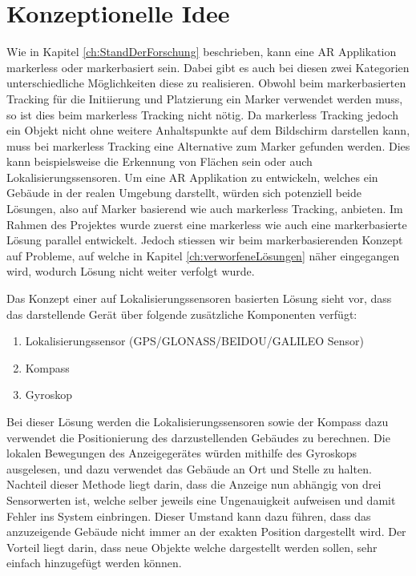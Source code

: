 \documentclass[a4paper]{scrreprt}
\begin{document}
\section{Konzeptionelle Idee}
\label{ch:KonzeptionelleIdee}
Wie in Kapitel \ref{ch:StandDerForschung} beschrieben, kann eine AR Applikation markerless oder markerbasiert sein. Dabei gibt es auch bei diesen zwei Kategorien unterschiedliche Möglichkeiten diese zu realisieren. Obwohl beim markerbasierten Tracking für die Initiierung und Platzierung ein Marker verwendet werden muss, so ist dies beim markerless Tracking nicht nötig. Da markerless Tracking jedoch ein Objekt nicht ohne weitere Anhaltspunkte auf dem Bildschirm darstellen kann, muss bei markerless Tracking eine Alternative zum Marker gefunden werden. Dies kann beispielsweise die Erkennung von Flächen sein \parencite{GoogleARCore2018} oder auch Lokalisierungssensoren.
Um eine AR Applikation zu entwickeln, welches ein Gebäude in der realen Umgebung darstellt, würden sich potenziell beide Lösungen, also auf Marker basierend wie auch markerless Tracking, anbieten.
Im Rahmen des Projektes wurde zuerst eine markerless wie auch eine markerbasierte Lösung parallel entwickelt. Jedoch stiessen wir beim markerbasierenden Konzept auf Probleme, auf welche in Kapitel \ref{ch:verworfeneLösungen} näher eingegangen wird, wodurch Lösung nicht weiter verfolgt wurde.


\bigbreak
Das Konzept einer auf Lokalisierungssensoren basierten Lösung sieht vor, dass das darstellende Gerät über folgende zusätzliche Komponenten verfügt:
\begin{enumerate}
	\item Lokalisierungssensor (GPS/GLONASS/BEIDOU/GALILEO Sensor)
	\item Kompass
	\item Gyroskop
\end{enumerate}

Bei dieser Lösung werden die Lokalisierungssensoren sowie der Kompass dazu verwendet die Positionierung des darzustellenden Gebäudes zu berechnen. Die lokalen Bewegungen des Anzeigegerätes würden mithilfe des Gyroskops ausgelesen, und dazu verwendet das Gebäude an Ort und Stelle zu halten.
Nachteil dieser Methode liegt darin, dass die Anzeige nun abhängig von drei Sensorwerten ist, welche selber jeweils eine Ungenauigkeit aufweisen und damit Fehler ins System einbringen. Dieser Umstand kann dazu führen, dass das anzuzeigende Gebäude nicht immer an der exakten Position dargestellt wird.
Der Vorteil liegt darin, dass neue Objekte welche dargestellt werden sollen, sehr einfach hinzugefügt werden können.
\end{document}
